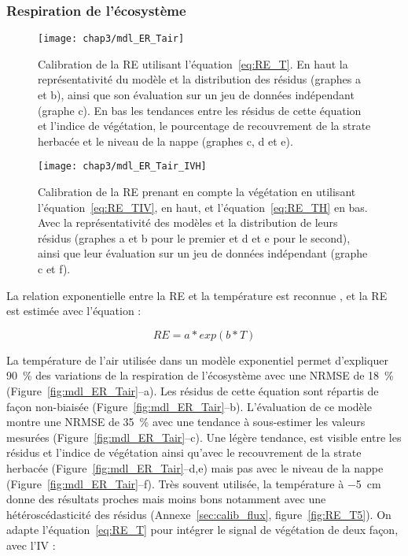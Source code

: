 \subsubsection{Respiration de l'écosystème}

\begin{figure} %
\centering
\texttt{[image: chap3/mdl\_ER\_Tair]}
\caption{\label{fig:mdl_ER_Tair}
Calibration de la RE utilisant l'équation~\ref{eq:RE_T}. En haut la représentativité du modèle et la distribution des résidus (graphes a et b), ainsi que son évaluation sur un jeu de données indépendant (graphe c). En bas les tendances entre les résidus de cette équation et l'indice de végétation, le pourcentage de recouvrement de la strate herbacée et le niveau de la nappe (graphes c, d et e).}
\texttt{[image: chap3/mdl\_ER\_Tair\_IVH]}
\caption{\label{fig:ER_mdl_TairIVH}Calibration de la RE prenant en compte la végétation en utilisant l'équation~\ref{eq:RE_TIV}, en haut, et l'équation~\ref{eq:RE_TH} en bas. Avec la représentativité des modèles et la distribution de leurs résidus (graphes a et b pour le premier et d et e pour le second), ainsi que leur évaluation sur un jeu de données indépendant (graphe c et f).}
\end{figure}

La relation exponentielle entre la RE et la température est reconnue \cite{luo2006}, et la RE est estimée avec l'équation :

\begin{equation} \label{eq:RE_T}
RE = a*exp(b*T)
\end{equation}

La température de l'air utilisée dans un modèle exponentiel permet d'expliquer \SI{90}{\percent} des variations de la respiration de l'écosystème avec une NRMSE de \SI{18}{\percent} (Figure~\ref{fig:mdl_ER_Tair}--a).
Les résidus de cette équation sont répartis de façon non-biaisée (Figure~\ref{fig:mdl_ER_Tair}--b).
L'évaluation de ce modèle montre une NRMSE de \SI{35}{\percent} avec une tendance à sous-estimer les valeurs mesurées (Figure~\ref{fig:mdl_ER_Tair}--c).
Une légère tendance, est visible entre les résidus et l'indice de végétation ainsi qu'avec le recouvrement de la strate herbacée (Figure~\ref{fig:mdl_ER_Tair}--d,e) mais pas avec le niveau de la nappe (Figure~\ref{fig:mdl_ER_Tair}--f).
Très souvent utilisée, la température à \SI{-5}{\centi\metre} donne des résultats proches mais moins bons notamment avec une hétéroscédasticité des résidus (Annexe~\ref{sec:calib_flux}, figure~\ref{fig:RE_T5}).
On adapte l'équation~\ref{eq:RE_T} pour intégrer le signal de végétation de deux façon, avec l'IV :

